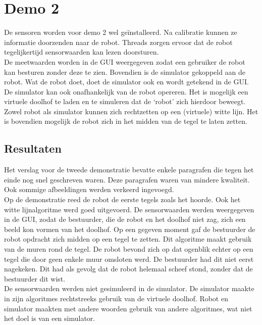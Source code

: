 \documentclass[tt3]{penoverslag}
\begin{document}
\section{Demo 2} %
\label{Asec:demo2}
De sensoren worden voor demo 2 wel ge\"installeerd. Na calibratie kunnen ze informatie doorzenden naar de robot. Threads zorgen ervoor dat de robot tegelijkertijd sensorwaarden kan lezen doorsturen.\\

De meetwaarden worden in de GUI weergegeven zodat een gebruiker de robot kan besturen zonder deze te zien. Bovendien is de simulator gekoppeld aan de robot. Wat de robot doet, doet de simulator ook en wordt getekend in de GUI. De simulator kan ook onafhankelijk van de robot opereren. Het is mogelijk een virtuele doolhof te laden en te simuleren dat de `robot' zich hierdoor beweegt. Zowel robot als simulator kunnen zich rechtzetten op een (virtuele) witte lijn. Het is bovendien mogelijk de robot zich in het midden van de tegel te laten zetten.


\subsection{Resultaten} %
\label{Assec:result2}
Het verslag voor de tweede demonstratie bevatte enkele paragrafen die tegen het einde nog snel geschreven waren. Deze paragrafen waren van mindere kwaliteit. Ook sommige afbeeldingen werden verkeerd ingevoegd.\\

Op de demonstratie reed de robot de eerste tegels zoals het hoorde. Ook het witte lijnalgoritme werd goed uitgevoerd. De sensorwaarden werden weergegeven in de GUI, zodat de bestuurder, die de robot en het doolhof niet zag, zich een beeld kon vormen van het doolhof. Op een gegeven moment gaf de bestuurder de robot opdracht zich midden op een tegel te zetten. Dit algoritme maakt gebruik van de muren rond de tegel. De robot bevond zich op dat ogenblik echter op een tegel die door geen enkele muur omsloten werd. De bestuurder had dit niet eerst nagekeken. Dit had als gevolg dat de robot helemaal scheef stond, zonder dat de bestuurder dit wist.\\

De sensorwaarden werden niet gesimuleerd in de simulator. De simulator maakte in zijn algoritmes rechtstreeks gebruik van de virtuele doolhof. Robot en simulator maakten met andere woorden gebruik van andere algoritmes, wat niet het doel is van een simulator.\\
\end{document}
